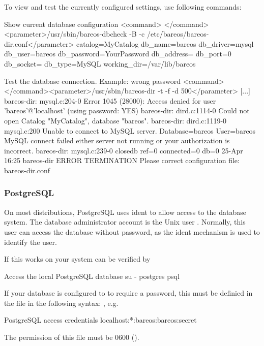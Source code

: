 To view and test the currently configured settings, use following commands:
\begin{commands}{Show current database configuration}
<command> </command><parameter>/usr/sbin/bareos-dbcheck -B -c /etc/bareos/bareos-dir.conf</parameter>
catalog=MyCatalog
db_name=bareos
db_driver=mysql
db_user=bareos
db_password=YourPassword
db_address=
db_port=0
db_socket=
db_type=MySQL
working_dir=/var/lib/bareos
\end{commands}

\begin{commands}{Test the database connection. Example: wrong password}
<command> </command><parameter>/usr/sbin/bareos-dir -t -f -d 500</parameter>
[...]
bareos-dir: mysql.c:204-0 Error 1045 (28000): Access denied for user 'bareos'@'localhost' (using password: YES)
bareos-dir: dird.c:1114-0 Could not open Catalog "MyCatalog", database "bareos".
bareos-dir: dird.c:1119-0 mysql.c:200 Unable to connect to MySQL server.
Database=bareos User=bareos
MySQL connect failed either server not running or your authorization is incorrect.
bareos-dir: mysql.c:239-0 closedb ref=0 connected=0 db=0
25-Apr 16:25 bareos-dir ERROR TERMINATION
Please correct configuration file: bareos-dir.conf
\end{commands}




\subsubsection{PostgreSQL}

On most distributions, PostgreSQL uses ident to allow access to the database system.
The database administrator account is the Unix user .
Normally, this user can access the database without password, as the ident mechanism is used to identify the user.

If this works on your system can be verified by
\begin{commands}{Access the local PostgreSQL database}
su - postgres
psql
\end{commands}

If your database is configured to to require a password, this must be definied in the file
in the following syntax: , e.g.
\begin{config}{PostgreSQL access credentials}
localhost:*:bareos:bareos:secret
\end{config}
The permission of this file must be 0600 ().

